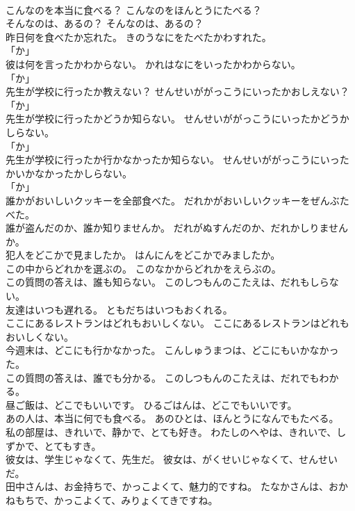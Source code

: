 \documentclass[8pt]{extreport}
\begin{document}
\begin{CJK}{UTF8}{min}
\\	こんなのを本当に食べる？	こんなのをほんとうにたべる？	
\\	そんなのは、あるの？	そんなのは、あるの？	
\\	昨日何を食べたか忘れた。	きのうなにをたべたかわすれた。	
\\	「か」 
\\	彼は何を言ったかわからない。	かれはなにをいったかわからない。	
\\	「か」 
\\	先生が学校に行ったか教えない？	せんせいががっこうにいったかおしえない？	
\\	「か」 
\\	先生が学校に行ったかどうか知らない。	せんせいががっこうにいったかどうかしらない。	
\\	「か」 
\\	先生が学校に行ったか行かなかったか知らない。	せんせいががっこうにいったかいかなかったかしらない。	
\\	「か」 
\\	誰かがおいしいクッキーを全部食べた。	だれかがおいしいクッキーをぜんぶたべた。	
\\	誰が盗んだのか、誰か知りませんか。	だれがぬすんだのか、だれかしりませんか。	
\\	犯人をどこかで見ましたか。	はんにんをどこかでみましたか。	
\\	この中からどれかを選ぶの。	このなかからどれかをえらぶの。	
\\	この質問の答えは、誰も知らない。	このしつもんのこたえは、だれもしらない。	
\\	友達はいつも遅れる。	ともだちはいつもおくれる。	
\\	ここにあるレストランはどれもおいしくない。	ここにあるレストランはどれもおいしくない。	
\\	今週末は、どこにも行かなかった。	こんしゅうまつは、どこにもいかなかった。	
\\	この質問の答えは、誰でも分かる。	このしつもんのこたえは、だれでもわかる。	
\\	昼ご飯は、どこでもいいです。	ひるごはんは、どこでもいいです。	
\\	あの人は、本当に何でも食べる。	あのひとは、ほんとうになんでもたべる。	
\\	私の部屋は、きれいで、静かで、とても好き。	わたしのへやは、きれいで、しずかで、とてもすき。	
\\	彼女は、学生じゃなくて、先生だ。	彼女は、がくせいじゃなくて、せんせいだ。	
\\	田中さんは、お金持ちで、かっこよくて、魅力的ですね。	たなかさんは、おかねもちで、かっこよくて、みりょくてきですね。	

\end{CJK}
\end{document}
